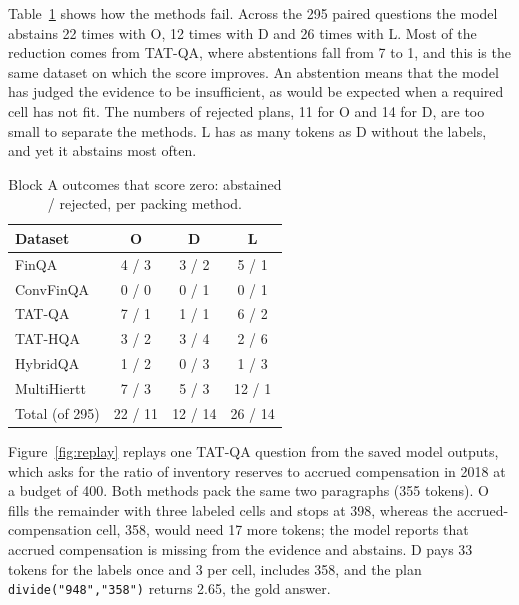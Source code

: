 \documentclass[11pt]{article}
\begin{document}
Table~\ref{tab:status} shows how the methods fail. Across the 295 paired questions the model abstains 22 times
with O, 12 times with D and 26 times with L. Most of the reduction comes from TAT-QA,
where abstentions fall from 7 to 1, and this is the same dataset on which the score
improves. An abstention means that the model has judged the evidence to be insufficient,
as would be expected when a required cell has not fit. The numbers of rejected plans, 11
for O and 14 for D, are too small to separate the methods. L has as many tokens as D
without the labels, and yet it abstains most often.

\begin{table}[t]
\centering\footnotesize\setlength{\tabcolsep}{3.5pt}
\begin{tabular}{lccc}
\toprule
Dataset & O & D & L\\\midrule
FinQA & 4 / 3 & 3 / 2 & 5 / 1\\
ConvFinQA & 0 / 0 & 0 / 1 & 0 / 1\\
TAT-QA & 7 / 1 & 1 / 1 & 6 / 2\\
TAT-HQA & 3 / 2 & 3 / 4 & 2 / 6\\
HybridQA & 1 / 2 & 0 / 3 & 1 / 3\\
MultiHiertt & 7 / 3 & 5 / 3 & 12 / 1\\\midrule
Total (of 295) & 22 / 11 & 12 / 14 & 26 / 14\\
\bottomrule
\end{tabular}
\caption{Block A outcomes that score zero: abstained / rejected, per packing method.}
\label{tab:status}
\end{table}

\begin{table}[t]
\centering\footnotesize\setlength{\tabcolsep}{2.2pt}

\caption{Block A answer scores (\%), Gemini 3.5 Flash-Lite. Execution accuracy for
FinQA and ConvFinQA, F1 otherwise.}
\label{tab:blocka}
\end{table}

Figure~\ref{fig:replay} replays one TAT-QA question from the saved model outputs, which
asks for the ratio of inventory reserves to accrued compensation in 2018 at a budget of
400. Both methods pack the same two paragraphs (355 tokens). O fills the remainder with
three labeled cells and stops at 398, whereas the accrued-compensation cell, 358, would
need 17 more tokens; the model reports that accrued compensation is missing from the
evidence and abstains. D pays 33 tokens for the labels once and 3 per cell, includes 358,
and the plan \texttt{divide("948","358")} returns 2.65, the gold answer.
\end{document}
